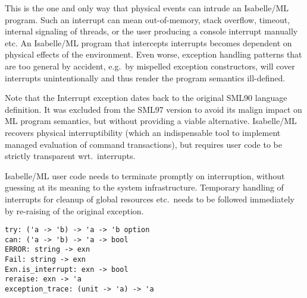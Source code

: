 \begin{isabellebody}
\begin{isamarkuptext}
  This is the one and only way that physical events can intrude an
  Isabelle/ML program.  Such an interrupt can mean out-of-memory,
  stack overflow, timeout, internal signaling of threads, or the user
  producing a console interrupt manually etc.  An Isabelle/ML program
  that intercepts interrupts becomes dependent on physical effects of
  the environment.  Even worse, exception handling patterns that are
  too general by accident, e.g.\ by mispelled exception constructors,
  will cover interrupts unintentionally and thus render the program
  semantics ill-defined.

  Note that the Interrupt exception dates back to the original SML90
  language definition.  It was excluded from the SML97 version to
  avoid its malign impact on ML program semantics, but without
  providing a viable alternative.  Isabelle/ML recovers physical
  interruptibility (which an indispensable tool to implement managed
  evaluation of command transactions), but requires user code to be
  strictly transparent wrt.\ interrupts.

  \begin{warn}
  Isabelle/ML user code needs to terminate promptly on interruption,
  without guessing at its meaning to the system infrastructure.
  Temporary handling of interrupts for cleanup of global resources
  etc.\ needs to be followed immediately by re-raising of the original
  exception.
  \end{warn}%
\end{isamarkuptext}%
\isamarkuptrue%
%
\isadelimmlref
%
\endisadelimmlref
%
\isatagmlref
%
\begin{isamarkuptext}%
\begin{mldecls}
  \verb|try: ('a -> 'b) -> 'a -> 'b option| \\
  \verb|can: ('a -> 'b) -> 'a -> bool| \\
  \verb|ERROR: string -> exn| \\
  \verb|Fail: string -> exn| \\
  \verb|Exn.is_interrupt: exn -> bool| \\
  \verb|reraise: exn -> 'a| \\
  \verb|exception_trace: (unit -> 'a) -> 'a| \\
  \end{mldecls}

  \begin{description}


\end{description}
\end{isamarkuptext}
\end{isabellebody}
